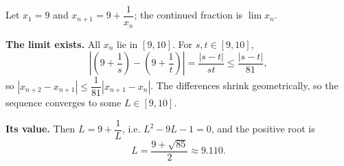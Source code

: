 Let $x_1=9$ and $x_{n+1}=9+\dfrac1{x_n}$; the continued fraction is $\lim x_n$.

\textbf{The limit exists.} All $x_n$ lie in $[9,10]$. For $s,t\in[9,10]$,
\[\left|\left(9+\dfrac1s\right)-\left(9+\dfrac1t\right)\right|=\dfrac{|s-t|}{st}\le\dfrac{|s-t|}{81},\]
so $|x_{n+2}-x_{n+1}|\le\dfrac{1}{81}|x_{n+1}-x_n|$. The differences shrink geometrically, so the sequence converges to some $L\in[9,10]$.

\textbf{Its value.} Then $L=9+\dfrac1L$, i.e. $L^2-9L-1=0$, and the positive root is
\[L=\boxed{\dfrac{9+\sqrt{85}}{2}}\approx9.110.\]
